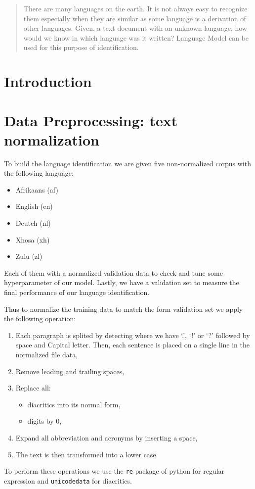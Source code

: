 \begin{abstract}
There are many languages on the earth. It is not always easy to recognize them especially when they are similar as some language is a derivation of other languages. Given, a text document with an unknown language, how would we know in which language was it written? Language Model can be used for this purpose of identification. 
\end{abstract}
\section{Introduction}


\section{Data Preprocessing: text normalization}
To build the language identification we are given five non-normalized corpus with the following language:
\begin{itemize}
    \item Afrikaans (af)
    \item English (en)
    \item Deutch (nl)
    \item Xhosa (xh)
    \item Zulu (zl)
\end{itemize}
Each of them with a normalized validation data to check and tune some hyperparameter of our model. Lastly, we have a validation set to measure the final performance of our language identification. 

Thus to normalize the training data to match the form validation set we apply the following operation:
\begin{enumerate}
    \item Each paragraph is splited by detecting where we have `.', `!' or  `?' followed by space and Capital letter. Then, each sentence is placed on a single line in the normalized file data,
    \item Remove leading and trailing spaces,
    \item Replace all:
    \begin{itemize}
        \item diacritics into its normal form,
        \item digits by 0,
    \end{itemize}
    \item Expand all abbreviation and acronyms by inserting a space,
    \item The text is then transformed into a lower case.
\end{enumerate}
To perform these operations we use the \texttt{re} package of python for regular expression and \texttt{unicodedata} for diacritics.

